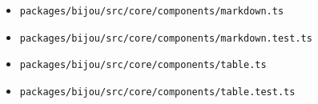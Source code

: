 \begin{itemize}
\item
  \texttt{p\allowbreak{}a\allowbreak{}c\allowbreak{}k\allowbreak{}a\allowbreak{}g\allowbreak{}e\allowbreak{}s\allowbreak{}/\allowbreak{}b\allowbreak{}i\allowbreak{}j\allowbreak{}o\allowbreak{}u\allowbreak{}/\allowbreak{}s\allowbreak{}r\allowbreak{}c\allowbreak{}/\allowbreak{}c\allowbreak{}o\allowbreak{}r\allowbreak{}e\allowbreak{}/\allowbreak{}c\allowbreak{}o\allowbreak{}m\allowbreak{}p\allowbreak{}o\allowbreak{}n\allowbreak{}e\allowbreak{}n\allowbreak{}t\allowbreak{}s\allowbreak{}/\allowbreak{}m\allowbreak{}a\allowbreak{}r\allowbreak{}k\allowbreak{}d\allowbreak{}o\allowbreak{}w\allowbreak{}n\allowbreak{}.\allowbreak{}t\allowbreak{}s}
\item
  \texttt{p\allowbreak{}a\allowbreak{}c\allowbreak{}k\allowbreak{}a\allowbreak{}g\allowbreak{}e\allowbreak{}s\allowbreak{}/\allowbreak{}b\allowbreak{}i\allowbreak{}j\allowbreak{}o\allowbreak{}u\allowbreak{}/\allowbreak{}s\allowbreak{}r\allowbreak{}c\allowbreak{}/\allowbreak{}c\allowbreak{}o\allowbreak{}r\allowbreak{}e\allowbreak{}/\allowbreak{}c\allowbreak{}o\allowbreak{}m\allowbreak{}p\allowbreak{}o\allowbreak{}n\allowbreak{}e\allowbreak{}n\allowbreak{}t\allowbreak{}s\allowbreak{}/\allowbreak{}m\allowbreak{}a\allowbreak{}r\allowbreak{}k\allowbreak{}d\allowbreak{}o\allowbreak{}w\allowbreak{}n\allowbreak{}.\allowbreak{}t\allowbreak{}e\allowbreak{}s\allowbreak{}t\allowbreak{}.\allowbreak{}t\allowbreak{}s}
\item
  \texttt{p\allowbreak{}a\allowbreak{}c\allowbreak{}k\allowbreak{}a\allowbreak{}g\allowbreak{}e\allowbreak{}s\allowbreak{}/\allowbreak{}b\allowbreak{}i\allowbreak{}j\allowbreak{}o\allowbreak{}u\allowbreak{}/\allowbreak{}s\allowbreak{}r\allowbreak{}c\allowbreak{}/\allowbreak{}c\allowbreak{}o\allowbreak{}r\allowbreak{}e\allowbreak{}/\allowbreak{}c\allowbreak{}o\allowbreak{}m\allowbreak{}p\allowbreak{}o\allowbreak{}n\allowbreak{}e\allowbreak{}n\allowbreak{}t\allowbreak{}s\allowbreak{}/\allowbreak{}t\allowbreak{}a\allowbreak{}b\allowbreak{}l\allowbreak{}e\allowbreak{}.\allowbreak{}t\allowbreak{}s}
\item
  \texttt{p\allowbreak{}a\allowbreak{}c\allowbreak{}k\allowbreak{}a\allowbreak{}g\allowbreak{}e\allowbreak{}s\allowbreak{}/\allowbreak{}b\allowbreak{}i\allowbreak{}j\allowbreak{}o\allowbreak{}u\allowbreak{}/\allowbreak{}s\allowbreak{}r\allowbreak{}c\allowbreak{}/\allowbreak{}c\allowbreak{}o\allowbreak{}r\allowbreak{}e\allowbreak{}/\allowbreak{}c\allowbreak{}o\allowbreak{}m\allowbreak{}p\allowbreak{}o\allowbreak{}n\allowbreak{}e\allowbreak{}n\allowbreak{}t\allowbreak{}s\allowbreak{}/\allowbreak{}t\allowbreak{}a\allowbreak{}b\allowbreak{}l\allowbreak{}e\allowbreak{}.\allowbreak{}t\allowbreak{}e\allowbreak{}s\allowbreak{}t\allowbreak{}.\allowbreak{}t\allowbreak{}s}
\end{itemize}

